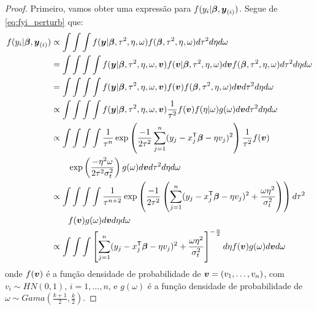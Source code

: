 \begin{proof}
Primeiro, vamos obter uma expressão para $f(y_i|{\boldsymbol{\beta}},{\boldsymbol{y}_{(i)}})$. Segue de \eqref{eq:fyi_perturb} que: 
\begin{align}\label{eq:sn_marg_1}
f(y_i|{\boldsymbol{\beta}},{\boldsymbol{y}_{(i)}}) & \propto \int\int\int f({\boldsymbol{y}}|{\boldsymbol{\beta}},{\tau^2},\eta,\omega) f({\boldsymbol{\beta}},{\tau^2},\eta,\omega) d{\tau^2} d\eta d\omega \notag \\
 {} &= \int\int\int \int f({\boldsymbol{y}}|{\boldsymbol{\beta}},{\tau^2},\eta,\omega,{\boldsymbol{v}})f({\boldsymbol{v}}|{\boldsymbol{\beta}},{\tau^2},\eta,\omega) d{\boldsymbol{v}} f({\boldsymbol{\beta}},{\tau^2},\eta,\omega)  d{\tau^2} d\eta d\omega \notag \\
 {} &= \int\int\int \int f({\boldsymbol{y}}|{\boldsymbol{\beta}},{\tau^2},\eta,\omega,{\boldsymbol{v}})f({\boldsymbol{v}}) f({\boldsymbol{\beta}},{\tau^2},\eta,\omega) d{\boldsymbol{v}} d{\tau^2} d\eta d\omega \notag \\
{}&\propto \int\int\int \int f({\boldsymbol{y}}|{\boldsymbol{\beta}},{\tau^2},\eta,\omega,{\boldsymbol{v}})\frac{1}{{\tau^2}}f({\boldsymbol{v}})f(\eta|\omega)g(\omega) d{\boldsymbol{v}} d{\tau^2} d\eta d\omega  \notag \\
{}& \propto \int\int\int \int \frac{1}{\tau^n}\exp\left(\frac{-1}{2{\tau^2}}\sum_{j=1}^n(y_j-x_j^{\mathsf{T}}{\boldsymbol{\beta}} - \eta v_j)^2\right)\frac{1}{{\tau^2}}f({\boldsymbol{v}}) \notag \\
{}& \qquad \exp\left(\frac{-\eta^2\omega}{2{\tau^2}\sigma^2_t}\right)g(\omega)d{\boldsymbol{v}} d{\tau^2} d\eta d\omega \notag \\
{}& \propto \int\int\int \int \frac{1}{\tau^{n+2}}\exp\left(\frac{-1}{2{\tau^2}}\left(\sum_{j=1}^n(y_j-x_j^{\mathsf{T}}{\boldsymbol{\beta}} - \eta v_j)^2+\frac{\omega\eta^2}{\sigma^2_t}\right)\right)  d{\tau^2}  \notag \\
{}& \qquad f({\boldsymbol{v}})g(\omega)d{\boldsymbol{v}} d\eta d\omega  \notag \\
{}& \propto  \int\int\int \left[\sum_{j=1}^n(y_j-x_j^{\mathsf{T}}{\boldsymbol{\beta}} - \eta v_j)^2+\frac{\omega\eta^2}{\sigma^2_t}\right]^{-\frac{n}{2}} d\eta f({\boldsymbol{v}})g(\omega)d{\boldsymbol{v}} d\omega
\end{align}
onde $f({\boldsymbol{v}})$ é a função densidade de probabilidade de ${\boldsymbol{v}}=(v_1,\ldots,v_n)$, com $v_i\sim HN(0,1)$, $i=1,\ldots,n$, e $g(\omega)$ é a função densidade de probabilidade de $\omega\sim Gama(\frac{k+1}{2},\frac{k}{2})$.


\end{proof}
